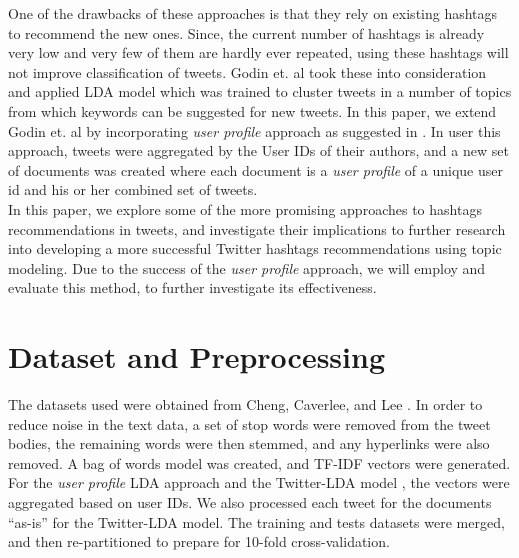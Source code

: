 \documentclass{acm_proc_article-sp}
\begin{document}
\hspace*{5mm}One of the drawbacks of these approaches is that they rely on existing hashtags to recommend the new ones. Since, the current number of hashtags is already very low and very few of them are hardly ever repeated, using these hashtags will not improve classification of tweets.  \cite{godin2013using} Godin et. al took these into consideration and applied LDA model which was trained to cluster tweets in a number of topics from which keywords can be suggested for new tweets. In this paper, we extend Godin et. al \cite{godin2013using} by incorporating \textit{user profile} approach as suggested in \cite{hong2010empirical} . In user this approach, tweets were aggregated by the User IDs of their authors, and a new set of documents was created where each document is a \textit{user profile} of a unique user id and his or her combined set of tweets.\\
\hspace*{5mm}In this paper, we explore some of the more promising approaches to hashtags recommendations in tweets, and investigate their implications to further research into developing a more successful Twitter hashtags recommendations using topic modeling. Due to the success of the \textit{user profile} approach, we will employ and evaluate this method, to further investigate its effectiveness.\\

\section{Dataset and Preprocessing}
\hspace*{5mm}The datasets used were obtained from Cheng, Caverlee, and Lee \cite{cheng2010content}. In order to reduce noise in the text data, a set of stop words were removed from the tweet bodies, the remaining words were then stemmed, and any hyperlinks were also removed. A bag of words model was created, and TF-IDF vectors were generated. For the \textit{user profile} LDA approach \cite{hong2010empirical} and the Twitter-LDA model \cite{zhao2011comparing}, the vectors were aggregated based on user IDs. We also processed each tweet for the documents ``as-is'' for the Twitter-LDA model. The training and tests datasets were merged, and then re-partitioned to prepare for 10-fold cross-validation.
\end{document}
